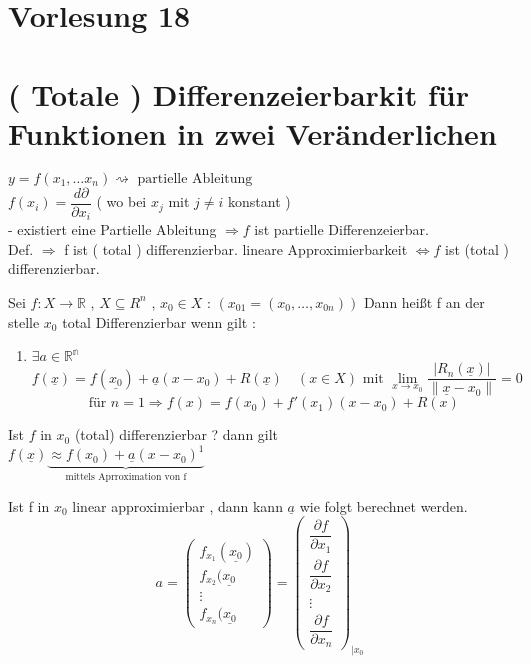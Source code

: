 \section{Vorlesung 18}
\section{( Totale ) Differenzeierbarkit für Funktionen in zwei Veränderlichen}
$y = f(x_1 , \dots x_n)\rightsquigarrow \text{ partielle Ableitung }$\\
$f(x_i) = \dfrac{d \partial}{ \partial x_i }$ ( wo bei $x_j$ mit $ j \neq i $ konstant )\\
- existiert eine Partielle Ableitung $\Rightarrow f $ ist partielle  Differenzeierbar.\\
Def. $\Rightarrow$ f ist ( total ) differenzierbar.
lineare Approximierbarkeit $\Leftrightarrow f$ ist (total ) differenzierbar. 
\begin{definition}  
Sei $f : X \rightarrow \mathbb{R}$ , $X \subseteq R^n$ , $x_0 \in X$ : $( x_{01} = (x_0 , \dots , x_{0n}))$ Dann heißt f an der stelle $x_0$ total Differenzierbar wenn gilt :\\
\begin{enumerate}
\item $\exists a \in \mathbb{R^n}$ \begin{equation*}
f(\underline{x})= f(\underline{x_0}) + \underline{a} (x-x_0) + R(\underline{x}) \quad (x \in X) \text{ mit } \lim_{x \to x_0} \dfrac{|R_n(\underline{x})|}
{\lVert \underline{x} - x_0 \rVert} = 0
\end{equation*}
\[ \text{ für } n = 1 \Rightarrow f(x)= f(x_0) + f'(x_1)(x-x_0) + R(x) \]
\end{enumerate}
\end{definition}
\begin{remark}
Ist $f$ in $x_0$ (total) differenzierbar ? dann gilt\\
$f(\underline{x}) \underbrace{ \approx f(x_0) + \underline{a}( x - x_0)^1}_{\text{ mittels Aprroximation von f  }}$
\end{remark}
\begin{remark}
Ist f in $x_0$ linear approximierbar , dann kann $\underline{a}$ wie folgt berechnet werden.
\begin{equation}
a = \begin{pmatrix}
f_{x_1}(\underline{x_0})\\
f_{x_2}(\underline{x_0}\\
\vdots\\
f_{x_n}(\underline{x_0}
\end{pmatrix} = 
\begin{pmatrix}
\dfrac{\partial f}{\partial x_1}\\
\dfrac{\partial f}{\partial x_2}\\
\vdots\\
\dfrac{\partial f}{\partial x_n}
\end{pmatrix}_{|x_0}
\end{equation}
\end{remark}
